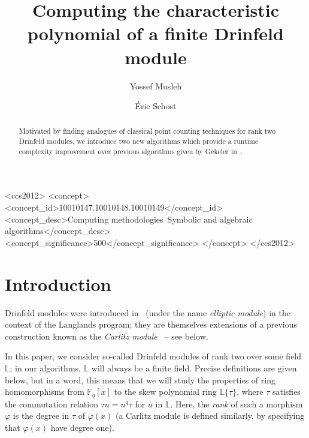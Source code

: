 \documentclass[sigconf]{acmart}
\newcommand{\F}{\mathbb{F}}
\renewcommand{\L}{\mathbb{L}}
\newcommand{\ang}[1]{\{#1\}}
\begin{document}
\title{Computing the characteristic polynomial of a finite Drinfeld module}

\author{Yossef Musleh}

\author{\'Eric Schost}



\begin{abstract}
  Motivated by finding analogues of classical point counting techniques
  for rank two Drinfeld modules, we introduce two new algorithms which
  provide a runtime complexity improvement over previous algorithms
  given by Gekeler in~\cite{GEKELE1991187}.
\end{abstract}

\begin{CCSXML}
<ccs2012>
<concept>
<concept_id>10010147.10010148.10010149</concept_id>
<concept_desc>Computing methodologies~Symbolic and algebraic algorithms</concept_desc>
<concept_significance>500</concept_significance>
</concept>
</ccs2012>
\end{CCSXML}



\maketitle


\section{Introduction}

Drinfeld modules were introduced in~\cite{DrinfeldXX} (under the 
name {\em elliptic module}) in the context of the Langlands program;
they are themselves extensions of a previous construction known 
as the {\em Carlitz module}~\cite{CarlitzXX} -- see below.

In this paper, we consider so-called Drinfeld modules of rank two over
some field $\L$; in our algorithms, $\L$ will always be a finite
field. Precise definitions are given below, but in a word, this means
that we will study the properties of ring homomorphisms from $\F_q[x]$ to
the skew polynomial ring $\L\ang{\tau}$, where $\tau$ satisfies the
commutation relation $\tau u = u^q \tau$ for $u$ in $\L$. Here, the
{\em rank} of such a morphism $\varphi$ is the degree in $\tau$ of
$\varphi(x)$ (a Carlitz module is defined similarly, by specifying that
$\varphi(x)$ have degree one).
\end{document}
